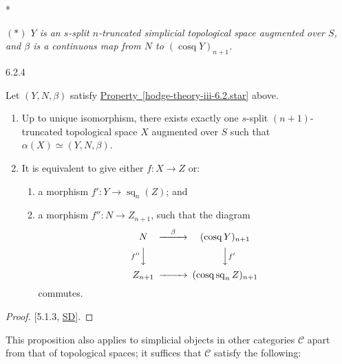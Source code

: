     \begin{property}{*}\setnumber{*}\label{hodge-theory-iii-6.2.star}\skipsinglepar\par{}\emph{\((*)\) \(Y\) is an \(s\)-split \(n\)-truncated simplicial topological space augmented over \(S\), and \(\beta \) is a continuous map from \(N\) to \((\operatorname {cosq} Y)_{n+1}\).}\end{property}\begin{proposition}{6.2.4}\label{hodge-theory-iii-6.2.4}\skipsinglepar\par{}Let \((Y,N,\beta )\) satisfy \hyperref[hodge-theory-iii-6.2.star]{Property~\ref*{hodge-theory-iii-6.2.star}} above.

    
 \begin{enumerate}
      
 \item[(i)]
        Up to unique isomorphism, there exists exactly one \(s\)-split \((n+1)\)-truncated topological space \(X\) augmented over \(S\) such that \(\alpha (X)\simeq (Y,N,\beta )\).
      


      
 \item[(ii)]
        It is equivalent to give either \(f\colon  X\to  Z\) or:

        
 \begin{enumerate}
          
 \item[(a)]
            a morphism \(f'\colon  Y\to \operatorname {sq}_n(Z)\); and
          

          
 \item[(b)]
            a morphism \(f''\colon  N\to  Z_{n+1}\), such that the diagram
            \[               \begin {CD}                 N @>\beta >> (\operatorname {cosq} Y)_{n+1}               \\@V{f''}VV @VV{f'}V               \\Z_{n+1} @>>> (\operatorname {cosq}\operatorname {sq}_n Z)_{n+1}               \end {CD}             \]
            commutes.
          

        \end{enumerate}

      

    \end{enumerate}\begin{proof}\par{}[5.1.3, \hyperref[SD]{SD}].\end{proof}\par{}This proposition also applies to simplicial objects in other categories \(\mathscr {C}\) apart from that of topological spaces; it suffices that \(\mathscr {C}\) satisfy the following:


\end{proposition}
